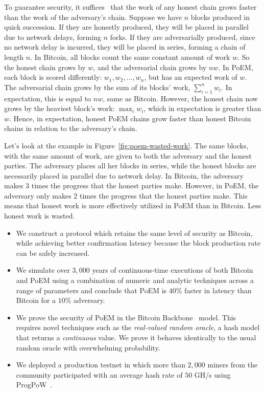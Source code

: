 To guarantee security, it suffices~\cite{eiar} that the work of any honest chain grows
faster than the work of the adversary's chain.
Suppose we have $n$ blocks produced in quick succession.
If they are honestly produced, they will be placed in parallel due to network delays,
forming $n$ forks.
If they are adversarially produced, since no network delay is incurred, they will be placed in series,
forming a chain of length $n$.
In Bitcoin, all blocks count the same constant amount of work $w$. So the honest chain grows by $w$,
and the adversarial chain grows by $n w$.
In PoEM, each block is scored differently: $w_1, w_2, \dots, w_n$, but has an expected work of $w$.
The adversarial chain grows by the sum of its blocks' work, $\sum_{i=1}^n w_i$.
In expectation, this is equal to $n w$, same as Bitcoin.
However, the honest chain now grows by the heaviest block's work: $\max_i w_i$,
which in expectation is greater than $w$. Hence, in expectation, honest PoEM chains grow
faster than honest Bitcoin chains in relation to the adversary's chain.

Let's look at the example in Figure~\ref{fig:poem-wasted-work}.
The same blocks, with the same amount of work, are given to both the adversary and the honest parties.
The adversary places all her blocks in series, while the honest blocks are necessarily placed in parallel
due to network delay.
In Bitcoin, the adversary makes $3$ times the progress that the honest parties make.
However, in PoEM, the adversary only makes $2$ times the progress that the honest parties make.
This means that honest work is more effectively utilized in PoEM than in Bitcoin.
Less honest work is wasted.

\noindent
{}
\begin{itemize}
  \item We construct a protocol which retains the same level of security as Bitcoin, while achieving
        better confirmation latency because the block production rate can be safely increased.

  \item We simulate over $3{,}000$ years of continuous-time executions of both Bitcoin and PoEM
        using a combination of numeric and analytic techniques across a range of parameters
        and conclude that PoEM is $40\%$ faster in latency than Bitcoin for a $10\%$ adversary.

  \item We prove the security of PoEM in the Bitcoin Backbone~\cite{backbone} model. This
        requires novel techniques such as the
        \emph{real-valued random oracle}, a hash model that returns a \emph{continuous} value.
        We prove it behaves identically to the usual random oracle with overwhelming probability.

  \item We deployed a production testnet in which
        more than $2{,}000$ miners from the community participated
        with an average hash rate of $50$ GH/s using ProgPoW~\cite{progpow}.
\end{itemize}

